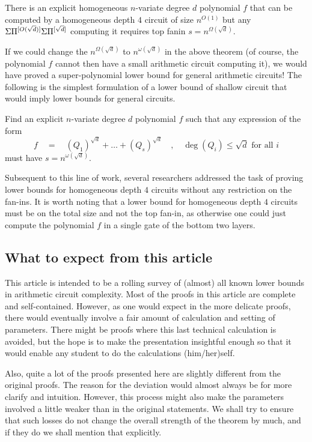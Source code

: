 \begin{theorem}
There is an explicit homogeneous $n$-variate degree $d$ polynomial $f$ that can be computed by a homogeneous depth $4$ circuit of size $n^{O(1)}$ but any $\Sigma\Pi^{[O(\sqrt{d})]}\Sigma\Pi^{[\sqrt{d}]}$ computing it requires top fanin $s = n^{\Omega(\sqrt{d})}$.
\end{theorem}

If we could change the $n^{\Omega(\sqrt{d})}$ to $n^{\omega(\sqrt{d})}$ in the above theorem (of course, the polynomial $f$ cannot then have a small arithmetic circuit computing it), we would have proved a super-polynomial lower bound for general arithmetic circuits! 
The following is the simplest formulation of a lower bound of shallow circuit that would imply lower bounds for general circuits. \\

\begin{openproblem}\label{openprob:main} Find an explicit $n$-variate degree $d$ polynomial $f$ such that any expression of the form
\[
f \quad=\quad (Q_1)^{\sqrt{d}} + \dots + (Q_{s})^{\sqrt{d}}\quad,\quad \deg(Q_i) \leq \sqrt{d} \text{ for all $i$}
\]
must have $s = n^{\omega(\sqrt{d})}$. 
\end{openproblem}
\bigskip 

Subsequent to this line of work, several researchers addressed the task of proving lower bounds for homogeneous depth $4$ circuits without any restriction on the fan-ins. 
It is worth noting that a lower bound for homogeneous depth $4$ circuits must be on the total size and not the top fan-in, as otherwise one could just compute the polynomial $f$ in a single gate of the bottom two layers. 

\subsection*{What to expect from this article}

This article is intended to be a rolling survey of (almost) all known lower bounds in arithmetic circuit complexity. 
Most of the proofs in this article are complete and self-contained. 
However, as one would expect in the more delicate proofs, there would eventually involve a fair amount of calculation and setting of parameters. 
There might be proofs where this last technical calculation is avoided, but the hope is to make the presentation insightful enough so that it would enable any student to do the calculations (him/her)self.

Also, quite a lot of the proofs presented here are slightly different from the original proofs. 
The reason for the deviation would almost always be for more clarify and intuition. 
However, this process might also make the parameters involved a little weaker than in the original statements. 
We shall try to ensure that such losses do not change the overall strength of the theorem by much, and if they do we shall mention that explicitly. \\


